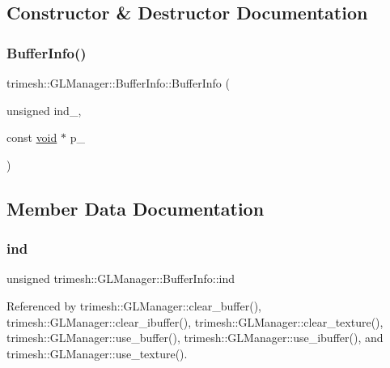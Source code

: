 \subsection{Constructor \& Destructor Documentation}
\mbox{\label{classtrimesh_1_1GLManager_1_1BufferInfo_ab381d4cc2e1b7a8ea5d7d50c6c1d48b1}} 
\subsubsection{\texorpdfstring{Buffer\+Info()}{BufferInfo()}}
{\footnotesize\ttfamily trimesh\+::\+G\+L\+Manager\+::\+Buffer\+Info\+::\+Buffer\+Info (\begin{DoxyParamCaption}\item[{unsigned}]{ind\+\_\+,  }\item[{const \hyperlink{namespacetrimesh_a784ddfd979e1c579bda795a8edfc3f43}{void} $\ast$}]{p\+\_\+ }\end{DoxyParamCaption})\hspace{0.3cm}{\ttfamily [inline]}}



\subsection{Member Data Documentation}
\mbox{\label{classtrimesh_1_1GLManager_1_1BufferInfo_a4a2777aeb5cdeada97a07db8eb4356ca}} 
\subsubsection{\texorpdfstring{ind}{ind}}
{\footnotesize\ttfamily unsigned trimesh\+::\+G\+L\+Manager\+::\+Buffer\+Info\+::ind}



Referenced by trimesh\+::\+G\+L\+Manager\+::clear\+\_\+buffer(), trimesh\+::\+G\+L\+Manager\+::clear\+\_\+ibuffer(), trimesh\+::\+G\+L\+Manager\+::clear\+\_\+texture(), trimesh\+::\+G\+L\+Manager\+::use\+\_\+buffer(), trimesh\+::\+G\+L\+Manager\+::use\+\_\+ibuffer(), and trimesh\+::\+G\+L\+Manager\+::use\+\_\+texture().

